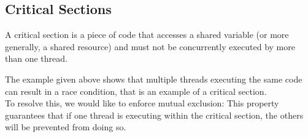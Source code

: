 \documentclass[a4paper, 10pt]{article}
\begin{document}
\subsection{Critical Sections}
\begin{definitionbox}
    A critical section is a piece of code that accesses a shared variable (or more generally, a shared resource) and must not be concurrently executed by more than one thread.
\end{definitionbox}
The example given above  shows that multiple threads executing the same code can result in a race condition, that is an example of a critical section. \\
To resolve this, we would like to enforce mutual exclusion: This property
guarantees that if one thread is executing within the critical section, the others will be prevented from doing so. \\
\end{document}
